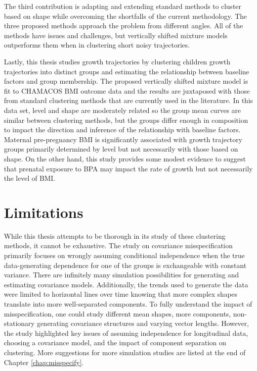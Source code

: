 The third contribution is adapting and extending standard methods to cluster based on shape while overcoming the shortfalls of the current methodology. The three proposed methods approach the problem from different angles. All of the methods have issues and challenges, but vertically shifted mixture models outperforms them when in clustering short noisy trajectories.

Lastly, this thesis studies growth trajectories by clustering children growth trajectories into distinct groups and estimating the relationship between baseline factors and group membership. The proposed vertically shifted mixture model is fit to CHAMACOS BMI outcome data and the results are juxtaposed with those from standard clustering methods that are currently used in the literature. In this data set, level and shape are moderately related so the group mean curves are similar between clustering methods, but the groups differ enough in composition to impact the direction and inference of the relationship with baseline factors. Maternal pre-pregnancy BMI is significantly associated with growth trajectory groups primarily determined by level but not necessarily with those based on shape. On the other hand, this study provides some modest evidence to suggest that prenatal exposure to BPA may impact the rate of growth but not necessarily the level of BMI.

\section{Limitations}
While this thesis attempts to be thorough in its study of these clustering methods, it cannot be exhaustive. The study on covariance misspecification primarily focuses on wrongly assuming conditional independence when the true data-generating dependence for one of the groups is exchangeable with constant variance. There are infinitely many simulation possibilities for generating and estimating covariance models. Additionally, the trends used to generate the data were limited to horizontal lines over time knowing that more complex shapes translate into more well-separated components. To fully understand the impact of misspecification, one could study different mean shapes, more components, non-stationary generating covariance structures and varying vector lengths. However, the study highlighted key issues of assuming independence for longitudinal data, choosing a covariance model, and the impact of component separation on clustering. More suggestions for more simulation studies are listed at the end of Chapter \ref{chap:misspecify}. 

